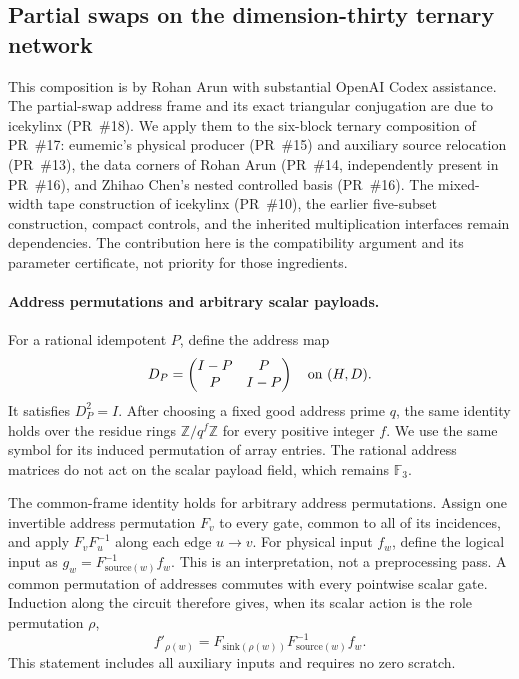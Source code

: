 \subsection{Partial swaps on the dimension-thirty ternary network}
\label{sec:partial-swap-ternary}
This composition is by Rohan Arun with substantial OpenAI Codex assistance.
The partial-swap address frame and its exact triangular conjugation are
due to icekylinx (PR~\#18). We apply them to the six-block ternary
composition of PR~\#17: eumemic's physical producer (PR~\#15) and
auxiliary source relocation (PR~\#13), the data corners of Rohan Arun
(PR~\#14, independently present in PR~\#16), and Zhihao Chen's nested
controlled basis (PR~\#16). The mixed-width tape construction of
icekylinx (PR~\#10), the earlier five-subset construction, compact
controls, and the inherited multiplication interfaces remain dependencies.
The contribution here is the compatibility argument and its parameter
certificate, not priority for those ingredients.

\paragraph{Address permutations and arbitrary scalar payloads.}
For a rational idempotent $P$, define the address map
\[
 D_P=\begin{pmatrix}I-P&P\\ P&I-P\end{pmatrix}
 \quad\hbox{on }(H,D).
\]
It satisfies $D_P^2=I$. After choosing a fixed good address prime $q$,
the same identity holds over the residue rings $\mathbb Z/q^f\mathbb Z$ for
every positive integer $f$. We use the same symbol for its induced
permutation of array entries. The rational address matrices do not act
on the scalar payload field, which remains $\mathbb F_3$.

The common-frame identity holds for arbitrary address permutations.
Assign one invertible address permutation $F_v$ to every gate, common
to all of its incidences, and apply $F_vF_u^{-1}$ along each edge
$u\to v$. For physical input $f_w$, define the logical input as
$g_w=F_{\mathrm{source}(w)}^{-1}f_w$. This is an interpretation, not a
preprocessing pass. A common permutation of addresses commutes with
every pointwise scalar gate. Induction along the circuit therefore gives,
when its scalar action is the role permutation $\rho$,
\[
 f'_{\rho(w)}=
 F_{\mathrm{sink}(\rho(w))}
 F_{\mathrm{source}(w)}^{-1}f_w.
\]
This statement includes all auxiliary inputs and requires no zero scratch.

